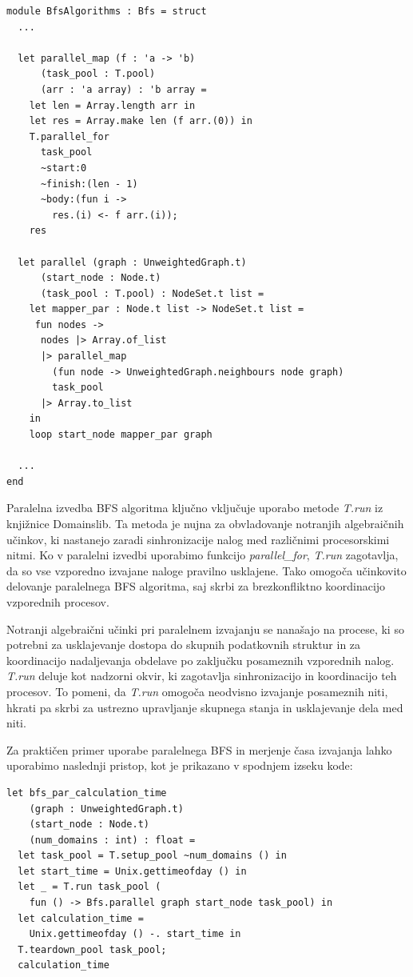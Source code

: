 \documentclass[mat1, tisk]{fmfdelo}
\begin{document}
\begin{lstlisting}[label=lst:bfs_parallel]
module BfsAlgorithms : Bfs = struct
  ...

  let parallel_map (f : 'a -> 'b)
      (task_pool : T.pool)
      (arr : 'a array) : 'b array =
    let len = Array.length arr in
    let res = Array.make len (f arr.(0)) in
    T.parallel_for 
      task_pool 
      ~start:0 
      ~finish:(len - 1) 
      ~body:(fun i ->
        res.(i) <- f arr.(i));
    res

  let parallel (graph : UnweightedGraph.t)
      (start_node : Node.t)
      (task_pool : T.pool) : NodeSet.t list =
    let mapper_par : Node.t list -> NodeSet.t list =
     fun nodes ->
      nodes |> Array.of_list
      |> parallel_map
        (fun node -> UnweightedGraph.neighbours node graph)
        task_pool
      |> Array.to_list
    in
    loop start_node mapper_par graph

  ...
end

\end{lstlisting}

Paralelna izvedba BFS algoritma ključno vključuje uporabo metode \textit{T.run} iz knjižnice Domainslib. Ta metoda je
nujna za obvladovanje notranjih algebraičnih učinkov, ki nastanejo zaradi sinhronizacije nalog med različnimi procesorskimi nitmi.
Ko v paralelni izvedbi uporabimo funkcijo \textit{parallel\_for}, \textit{T.run} zagotavlja, da so vse vzporedno
izvajane naloge pravilno usklajene. Tako omogoča učinkovito delovanje paralelnega BFS algoritma, saj skrbi za
brezkonfliktno koordinacijo vzporednih procesov.

Notranji algebraični učinki pri paralelnem izvajanju se nanašajo na procese, ki so potrebni za usklajevanje dostopa do
skupnih podatkovnih struktur in za koordinacijo nadaljevanja obdelave po zaključku posameznih vzporednih nalog.
\textit{T.run} deluje kot nadzorni okvir, ki zagotavlja sinhronizacijo in koordinacijo teh procesov.
To pomeni, da \textit{T.run} omogoča neodvisno izvajanje posameznih niti, hkrati pa skrbi za ustrezno upravljanje
skupnega stanja in usklajevanje dela med niti.

Za praktičen primer uporabe paralelnega BFS in merjenje časa izvajanja lahko uporabimo naslednji pristop, kot je prikazano v spodnjem izseku kode:

\begin{lstlisting}[label=lst:bfs_calculation_time]
let bfs_par_calculation_time 
    (graph : UnweightedGraph.t) 
    (start_node : Node.t)
    (num_domains : int) : float =
  let task_pool = T.setup_pool ~num_domains () in
  let start_time = Unix.gettimeofday () in
  let _ = T.run task_pool (
    fun () -> Bfs.parallel graph start_node task_pool) in
  let calculation_time =
    Unix.gettimeofday () -. start_time in
  T.teardown_pool task_pool;
  calculation_time
\end{lstlisting}
\end{document}
